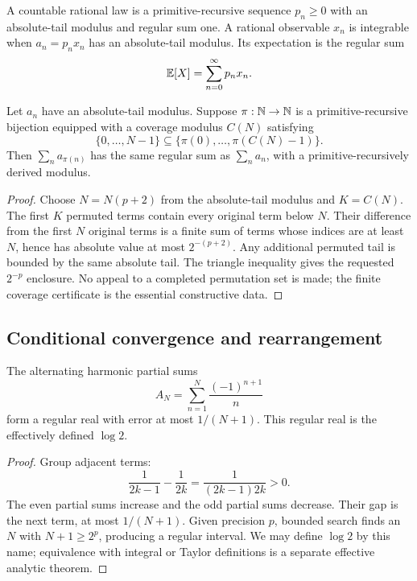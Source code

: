 \begin{definition}\label{def:countable-law}
A countable rational law is a primitive-recursive sequence
\(p_n\ge0\) with an absolute-tail modulus and regular sum one.  A rational
observable \(x_n\) is integrable when \(a_n=p_nx_n\) has an absolute-tail
modulus.  Its expectation is the regular sum
\[
 \mathbb E[X]=\sum_{n=0}^{\infty}p_nx_n.
\]
\end{definition}

\begin{theorem}\label{thm:reindex}
Let \(a_n\) have an absolute-tail modulus.  Suppose
\(\pi:\mathbb N\to\mathbb N\) is a primitive-recursive bijection equipped with a coverage
modulus \(C(N)\) satisfying
\[
 \{0,\ldots,N-1\}\subseteq
 \{\pi(0),\ldots,\pi(C(N)-1)\}.
\]
Then \(\sum_na_{\pi(n)}\) has the same regular sum as \(\sum_na_n\), with a
primitive-recursively derived modulus.
\end{theorem}

\begin{proof}
Choose \(N=N(p+2)\) from the absolute-tail modulus and
\(K=C(N)\).  The first \(K\) permuted terms contain every original term below
\(N\).  Their difference from the first \(N\) original terms is a finite sum
of terms whose indices are at least \(N\), hence has absolute value at most
\(2^{-(p+2)}\).  Any additional permuted tail is bounded by the same absolute
tail.  The triangle inequality gives the requested \(2^{-p}\) enclosure.
No appeal to a completed permutation set is made; the finite coverage
certificate is the essential constructive data.
\end{proof}

\subsection{Conditional convergence and rearrangement}

\begin{proposition}\label{prop:alt-harmonic}
The alternating harmonic partial sums
\[
 A_N=\sum_{n=1}^{N}\frac{(-1)^{n+1}}n
\]
form a regular real with error at most \(1/(N+1)\).  This regular real is the
effectively defined \(\log 2\).
\end{proposition}

\begin{proof}
Group adjacent terms:
\[
 \frac1{2k-1}-\frac1{2k}=\frac1{(2k-1)2k}>0.
\]
The even partial sums increase and the odd partial sums decrease.  Their gap is
the next term, at most \(1/(N+1)\).  Given precision \(p\), bounded search finds
an \(N\) with \(N+1\ge2^p\), producing a regular interval.  We may define
\(\log2\) by this name; equivalence with integral or Taylor definitions is a
separate effective analytic theorem.
\end{proof}

